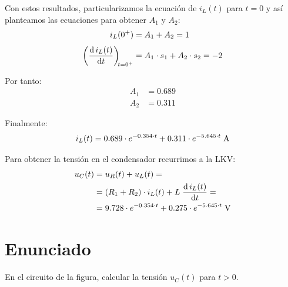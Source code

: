\vspace{2mm}
Con estos resultados, particularizamos la ecuación de $i_L(t)$ para
$t = 0$ y así planteamos las ecuaciones para obtener $A_1$ y $A_2$:
\begin{align*}
  i_L(0^+) &= A_1 + A_2 = 1\\[3pt]
  \diff{\, i_L(t)}{t}[t = 0^+] &= A_1 \cdot s_1 + A_2 \cdot s_2 = -2
\end{align*}

Por tanto:
\begin{align*}
  A_1 &= 0.689\\
  A_2 &= 0.311
\end{align*}

Finalmente:
\begin{equation*}
  i_L(t) = 0.689 \cdot e^{-0.354 \cdot t} + 0.311 \cdot e^{-5.645 \cdot t}\;\si{\ampere}\\
\end{equation*}

\vspace{3mm}
Para obtener la tensión en el condensador recurrimos a la LKV:
\begin{align*}
  u_C(t) &= u_R(t) + u_L(t) = \\
         &= (R_1 + R_2) \cdot i_L(t) + L \; \diff{\, i_L(t)}{t} = \\
         &= 9.728 \cdot e^{-0.354 \cdot t} + 0.275 \cdot e^{-5.645 \cdot t} \;\si{\volt}
\end{align*}

\section{Enunciado}
En el circuito de la figura, calcular la tensión $u_C(t)$ para $t > 0$.

